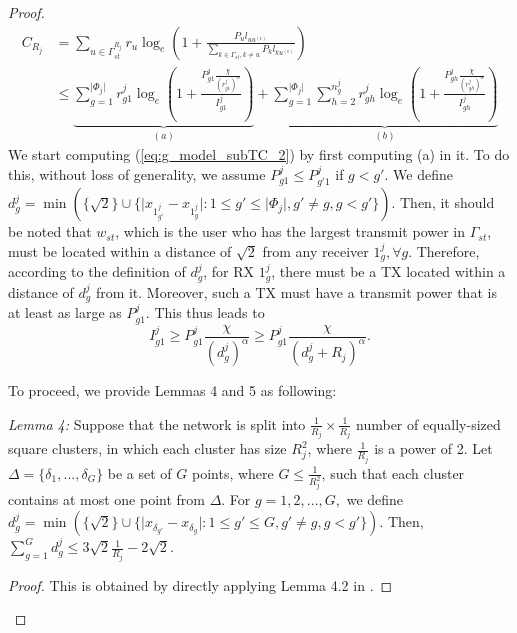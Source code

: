 \documentclass[journal,draftclsnofoot,onecolumn,12pt,twoside]{IEEEtran}
\begin{document}
\begin{proof}
\begin{equation}
\begin{aligned}\label{eq:g_model_subTC_2}
C_{R_j}&=\sum_{u\in\Gamma_{st}^{R_j}}r_u\log_e\left(1+\frac{P_ul_{uu^{(\text{r})}}}{\sum_{k\in\Gamma_{st},k\neq u}P_kl_{ku^{(\text{r})}}}\right)\\
&\leq \underbrace{\sum_{g=1}^{\vert\Phi_j\vert} r_{g1}^j\log_e\left(1+\frac{P_{g1}^j\frac{\chi}{(r_{g1}^j)^{\alpha}}}{I_{g1}^j}\right)}_{(a)}+\underbrace{\sum_{g=1}^{\vert\Phi_j\vert}\sum_{h=2}^{n_g^j} r_{gh}^j\log_e\left(1+\frac{P_{gh}^j\frac{\chi}{(r_{gh}^j)^{\alpha}}}{I_{gh}^j}\right)}_{(b)}
\end{aligned}
\end{equation}
We start computing (\ref{eq:g_model_subTC_2}) by first computing (a) in it. To do this, without loss of generality, we assume $P_{g1}^j\leq P_{g'1}^j$ if $g<g'$. We define $d_g^j=\min\left(\lbrace\sqrt{2}\rbrace\cup\lbrace \vert x_{1_{g'}^j}-x_{1_g^j}\vert:1\leq g'\leq \vert\Phi_j\vert,g'\neq g,g<g' \rbrace\right)$. Then, it should be noted that $w_{st}$, which is the user who has the largest transmit power in $\Gamma_{st}$, must be located within a distance of $\sqrt{2}$ from any receiver $1_{g}^j,\forall g$. Therefore, according to the definition of $d_g^j$, for RX $1_{g}^j$, there must be a TX located within a distance of $d_g^j$ from it. Moreover, such a TX must have a transmit power that is at least as large as $P_{g1}^j$. This thus leads to
\begin{equation}\label{eq:Inter_g1_inequa}
I_{g1}^j\geq P_{g1}^j \frac{\chi}{(d_g^j)^{\alpha}}\geq P_{g1}^j \frac{\chi}{(d_g^j+R_j)^{\alpha}}.
\end{equation}

To proceed, we provide Lemmas 4 and 5 as following:

{\em Lemma 4:} Suppose that the network is split into $\frac{1}{R_j}\times \frac{1}{R_j}$ number of equally-sized square clusters, in which each cluster has size $R_j^2$, where $\frac{1}{R_j}$ is a power of 2. Let $\Delta=\lbrace\delta_1,...,\delta_G\rbrace$ be a set of $G$ points, where $G\leq \frac{1}{R_j^2}$, such that each cluster contains at most one point from $\Delta$. For $g=1,2,...,G,$ we define $d_g^j=\min\left(\lbrace\sqrt{2}\rbrace\cup\lbrace \vert x_{\delta_{g'}}-x_{\delta_g}\vert:1\leq g'\leq G,g'\neq g,g<g' \rbrace\right)$. Then, $\sum_{g=1}^G d_g^j\leq 3\sqrt{2}\frac{1}{R_j}-2\sqrt{2}$.

\begin{proof}
This is obtained by directly applying Lemma 4.2 in \cite{agarwal2004capacity}.
\end{proof}


\end{proof}
\end{document}
